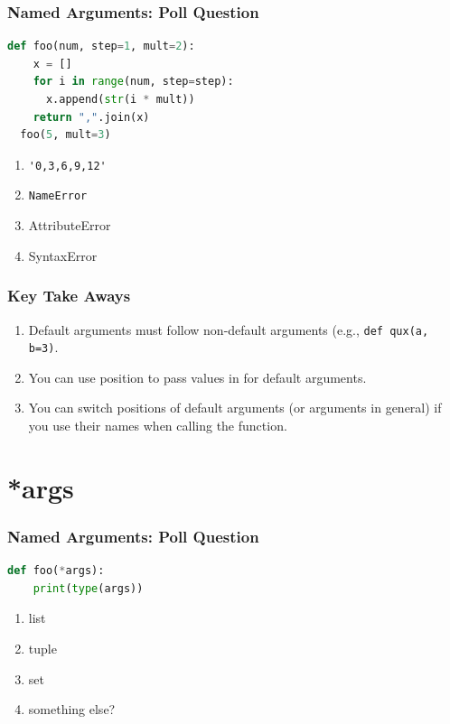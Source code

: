 \documentclass{beamer}
\begin{document}
%
%
\begin{frame}[fragile]
  \frametitle{Named Arguments: Poll Question}
  \begin{lstlisting}[language=Python, autogobble]
  def foo(num, step=1, mult=2):
    x = []
    for i in range(num, step=step):
      x.append(str(i * mult))
    return ",".join(x)
  foo(5, mult=3)
  \end{lstlisting}
  \vfill
  \begin{enumerate}[A]
    \item \lstinline|'0,3,6,9,12'|
    \item \lstinline|NameError|
    \item AttributeError
    \item SyntaxError
  \end{enumerate}
\end{frame}


%
%
\begin{frame}[fragile]
  \frametitle{Key Take Aways}
  \begin{enumerate}
      \pause
    \item Default arguments must follow non-default arguments (e.g., \lstinline|def qux(a, b=3)|.
      \pause
    \item You can use position to pass values in for default arguments.
      \pause
    \item You can switch positions of default arguments (or arguments in general) if you use their names when calling the function.
  \end{enumerate}
\end{frame}


\section{*args}

%
%
\begin{frame}[fragile]
  \frametitle{Named Arguments: Poll Question}
  \begin{lstlisting}[language=Python, autogobble]
  def foo(*args):
    print(type(args))
  \end{lstlisting}
  \vfill
  \begin{enumerate}[A]
    \item list
    \item tuple
    \item set
    \item something else?
  \end{enumerate}
\end{frame}
\end{document}

